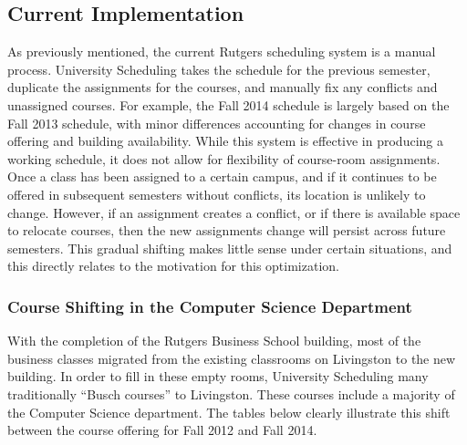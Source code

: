 \documentclass{acm_proc_article-sp}
\begin{document}
	\subsection{Current Implementation}
		As previously mentioned, the current Rutgers scheduling system is a manual
		process. University Scheduling takes the schedule for the previous semester,
		duplicate the assignments for the courses, and manually fix any conflicts and
		unassigned courses. For example, the Fall 2014 schedule is largely based on the
		Fall 2013 schedule, with minor differences accounting for changes in course
		offering and building availability. While this system is effective in producing
		a working schedule, it does not allow for flexibility of course-room
		assignments. Once a class has been assigned to a certain campus, and if it
		continues to be offered in subsequent semesters without conflicts, its location
		is unlikely to change. However, if an assignment creates a conflict, or if
		there is available space to relocate courses, then the new assignments change
		will persist across future semesters. This gradual shifting makes little sense
		under certain situations, and this directly relates to the motivation for this
		optimization.

		\subsubsection{Course Shifting in the Computer Science Department}
			With the completion of the Rutgers Business School building, most of the
			business classes migrated from the existing classrooms on Livingston to the new
			building. In order to fill in these empty rooms, University Scheduling many
			traditionally “Busch courses” to Livingston. These courses include a majority
			of the Computer Science department. The tables below clearly illustrate this
			shift between the course offering for Fall 2012 and Fall 2014.
			
\end{document}
